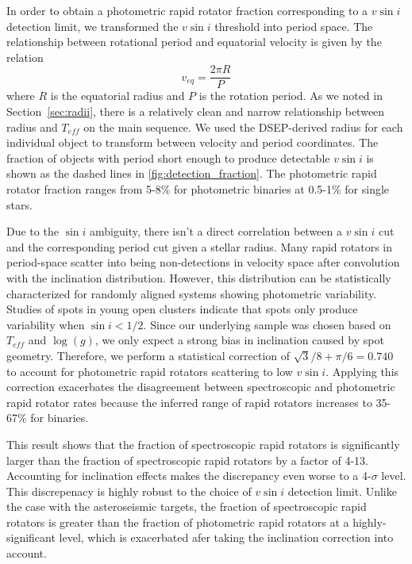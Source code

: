 \documentclass[manuscript]{aastex6}
\newcommand{\vsini}{\ensuremath{v \sin i}}
\newcommand{\Teff}{\ensuremath{T_{eff}}}
\newcommand{\logg}{\ensuremath{\log(g)}}
\begin{document}
In order to obtain a photometric rapid rotator fraction corresponding to
a \vsini{} detection limit, we transformed the \vsini{} threshold into period 
space. The relationship between rotational period and equatorial velocity is 
given by the relation 
\begin{displaymath}
    v_{eq} = \frac{2 \pi R}{P} 
\end{displaymath}
where \(R\) is the equatorial radius and \(P\) is the rotation period. As we
noted in Section~\ref{sec:radii}, there is a relatively clean and narrow
relationship between radius and \Teff{} on the main sequence. We used the 
DSEP-derived radius for each individual object to transform  between
velocity and period coordinates. The fraction of objects with period
short enough to produce detectable \vsini{} is shown as the dashed 
lines in \cref{fig:detection_fraction}. The photometric rapid rotator fraction
ranges from 5-8\% for photometric binaries at 0.5-1\% for single stars.


Due to the \(\sin i\) ambiguity, there isn't a direct correlation
between a \vsini{} cut and the corresponding period cut given a stellar radius.
Many rapid rotators in period-space scatter into being non-detections in
velocity space after convolution with the inclination distribution. However,
this distribution can be statistically characterized for randomly
aligned systems showing photometric variability. Studies of spots in young open
clusters indicate that spots only produce variability when \(\sin i < 1/2\). 
Since our underlying sample was chosen based on
\Teff{} and \logg{}, we only expect a strong bias in inclination caused by spot
geometry.
Therefore, we perform a statistical correction of \(\sqrt{3}/8+\pi/6=0.740\)
to account for photometric rapid rotators scattering to low
\vsini{}. Applying this correction exacerbates the disagreement between
spectroscopic and photometric rapid rotator rates because the inferred range of
rapid rotators increases to 35-67\% for binaries.

This result shows that the fraction of
spectroscopic rapid rotators is significantly larger than the fraction
of spectroscopic rapid rotators by a factor of 4-13. Accounting for
inclination effects makes the discrepancy even worse to a 4-\(\sigma\)
level. This discrepenacy is highly robust to the choice of
\vsini{} detection limit. Unlike  
the case with the asteroseismic targets, the fraction of spectroscopic rapid
rotators is greater than the fraction of photometric rapid
rotators at a highly-significant level, which is exacerbated afer taking the
inclination correction into account.
\end{document}
